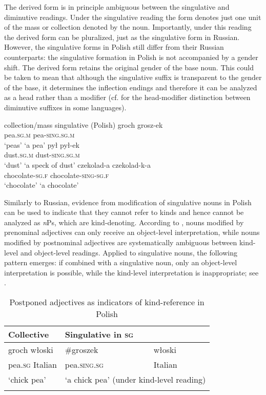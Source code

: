 \documentclass[output=paper,colorlinks,citecolor=brown,
]{langscibook}
\begin{document}
The derived form is in principle ambiguous between the singulative and diminutive readings. Under the singulative reading the form denotes just one unit of the mass or collection denoted by the noun. Importantly, under this reading the derived form can be pluralized, just as the singulative form in Russian. However, the singulative forms in Polish still differ from their Russian counterparts: the singulative formation in Polish is not accompanied by a gender shift. The derived form retains the original gender of the base noun. This could be taken to mean that although the singulative suffix is transparent to the gender of the base, it determines the inflection endings and therefore it can be analyzed as a head rather than a modifier (cf. \citealt{WiltschkoSteriopolo2008} for the head-modifier distinction between diminutive suffixes in some languages). 

\ea\label{ex:30} 
\hspace{.5cm} collection/mass \phantom{i} singulative \hfill (Polish)
\ea 
\gll groch \phantom{XXXXi} grosz-ek \\
pea.\textsc{sg.m} {} pea-\textsc{sing.sg.m} \\
 \glt `peas' \phantom{XXXXXXi} `a pea'\label{ex:30a}
\ex
\gll pył \phantom{XXXX} pył-ek \\
dust.\textsc{sg.m} {} dust-\textsc{sing.sg.m}  \\
\glt `dust' \phantom{XXXXXXi} `a speck of dust'\label{ex:30b} 
\ex
\gll czekolad-a \phantom{X} czekolad-k-a \\
       chocolate-\textsc{\textsc{sg.f}} {} chocolate-\textsc{sing-\textsc{sg.f}} \\
 \glt `chocolate' \phantom{XXXi} `a chocolate'\label{ex:30c}
\z\z 

\noindent Similarly to Russian, evidence from modification of singulative nouns in Polish can be used to indicate that they cannot refer to kinds and hence cannot be analyzed as \textit{n}Ps, which are kind-denoting. According to \citet{Wagiel2014}, nouns modified by prenominal adjectives can only receive an object-level interpretation, while nouns modified by postnominal adjectives are systematically ambiguous between kind-level and object-level readings. Applied to singulative nouns, the following pattern emerges: if combined with a singulative noun, only an object-level interpretation is possible, while the kind-level interpretation is inappropriate; see .  

\begin{table}
\centering
\begin{tabular}{lll} 
\lsptoprule
Collective & \multicolumn{2}{l}{Singulative in \textsc{sg}} \\
\midrule
groch włoski & \#groszek & włoski \\ 
pea.\textsc{sg} Italian & \phantom{\#}pea.\textsc{sing.sg} & Italian \\ 
`chick pea' & \multicolumn{2}{l}{`a chick pea' (under kind-level reading)} \\ 
\lspbottomrule
\end{tabular}
\caption{Postponed adjectives as indicators of kind-reference in Polish}
\label{tab:postponed_Pol}
\end{table}
\end{document}
